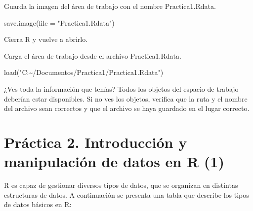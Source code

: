 \documentclass[
  letterpaper,
  DIV=11,
  numbers=noendperiod]{scrreprt}
\newenvironment{Shaded}{\begin{snugshade}}{\end{snugshade}}
\newcommand{\AttributeTok}[1]{\textcolor[rgb]{0.40,0.45,0.13}{#1}}
\newcommand{\FunctionTok}[1]{\textcolor[rgb]{0.28,0.35,0.67}{#1}}
\newcommand{\NormalTok}[1]{\textcolor[rgb]{0.00,0.23,0.31}{#1}}
\newcommand{\StringTok}[1]{\textcolor[rgb]{0.13,0.47,0.30}{#1}}
\begin{document}
Guarda la imagen del área de trabajo con el nombre Practica1.Rdata.

\begin{Shaded}
\begin{Highlighting}[]
\FunctionTok{save.image}\NormalTok{(}\AttributeTok{file =} \StringTok{"Practica1.Rdata"}\NormalTok{)}
\end{Highlighting}
\end{Shaded}

Cierra R y vuelve a abrirlo.

Carga el área de trabajo desde el archivo Practica1.Rdata.

\begin{Shaded}
\begin{Highlighting}[]
\FunctionTok{load}\NormalTok{(}\StringTok{"C:\textasciitilde{}/Documentos/Practica1/Practica1.Rdata"}\NormalTok{)}
\end{Highlighting}
\end{Shaded}

¿Ves toda la información que tenías? Todos los objetos del espacio de
trabajo deberían estar disponibles. Si no ves los objetos, verifica que
la ruta y el nombre del archivo sean correctos y que el archivo se haya
guardado en el lugar correcto.

\hypertarget{pruxe1ctica-2.-introducciuxf3n-y-manipulaciuxf3n-de-datos-en-r-1}{%
\chapter{\texorpdfstring{{Práctica 2. Introducción y manipulación de
datos en R
(1)}}{Práctica 2. Introducción y manipulación de datos en R (1)}}\label{pruxe1ctica-2.-introducciuxf3n-y-manipulaciuxf3n-de-datos-en-r-1}}

R es capaz de gestionar diversos tipos de datos, que se organizan en
distintas estructuras de datos. A continuación se presenta una tabla que
describe los tipos de datos básicos en R:
\end{document}
